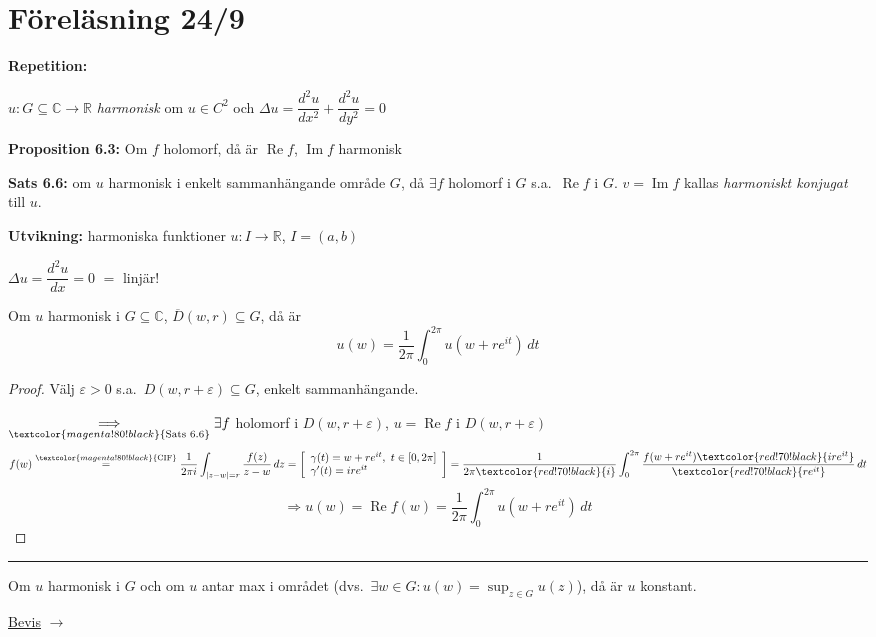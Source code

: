 \section{Föreläsning 24/9}

\textbf{Repetition:}

$u : G \subseteq \mathbb{C} \to \mathbb{R}$ \emph{harmonisk} om $u \in C^2$ och $\Delta u = \dfrac{d^2u}{dx^2} + \dfrac{d^2u}{dy^2} = 0$

\textbf{Proposition 6.3:} Om $f$ holomorf, då är $\operatorname{Re} f$, $\operatorname{Im} f$ harmonisk

\textbf{Sats 6.6:} om $u$ harmonisk i enkelt sammanhängande område $G$, då $\exists f$ holomorf i $G$ s.a.\ $\operatorname{Re} f$ i $G$. $v = \operatorname{Im} f$ kallas \emph{harmoniskt konjugat} till $u$.

\textbf{Utvikning:} harmoniska funktioner $u : I \to \mathbb{R}$, $I = (a, b)$

$\Delta u = \dfrac{d^2u}{dx} = 0$
$=$ linjär!

\begin{theorem}
Om $u$ harmonisk i $G \subseteq \mathbb{C}$, $\overline{D}(w, r) \subseteq G$, då är
\[ u(w) = \frac{1}{2\pi} \int_0^{2\pi} u(w + re^{it})\,dt \]
\end{theorem}
\begin{proof}
Välj $\varepsilon > 0$ s.a.\ $D(w, r + \varepsilon) \subseteq G$, enkelt sammanhängande.

$\underset{\textcolor{magenta!80!black}{\text{Sats 6.6}}}{\Longrightarrow} \exists f$ holomorf i $D(w, r + \varepsilon)$, $u = \operatorname{Re} f$ i $D(w, r + \varepsilon)$
\[ f(w) \overset{\textcolor{magenta!80!black}{\text{CIF}}}{=} \frac{1}{2\pi i} \int_{|z - w| = r} \frac{f(z)}{z - w}\,dz = \left[ \begin{array}{l} \gamma(t) = w + re^{it},\ t \in [0, 2\pi] \\ \gamma'(t) = ire^{it} \end{array} \right] = \frac{1}{2\pi \textcolor{red!70!black}{i}} \int_0^{2\pi} \frac{f(w + re^{it})\textcolor{red!70!black}{ire^{it}}}{\textcolor{red!70!black}{re^{it}}}\,dt \]
\[ \Rightarrow u(w) = \operatorname{Re} f(w) = \frac{1}{2\pi} \int_0^{2\pi} u(w + re^{it})\,dt \]
\end{proof}

\noindent\rule{\linewidth}{0.4pt}

\begin{theorem}
Om $u$ harmonisk i $G$ och om $u$ antar max i området (dvs.\ $\exists w \in G : u(w) = \sup_{z \in G} u(z)$), då är $u$ konstant.
\end{theorem}

\hfill \textcolor{red!70!black}{\underline{Bevis}} $\rightarrow$
